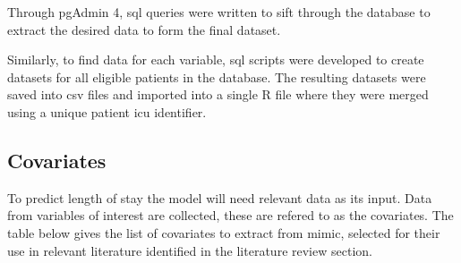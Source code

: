 \documentclass[11pt]{article}
\begin{document}
Through pgAdmin 4, \gls{sql} queries were written to sift through the database to extract the desired data to form the final dataset.

Similarly, to find data for each variable, \gls{sql} scripts were developed to create datasets for all eligible patients in the database. The resulting datasets were saved into \gls{csv} files and imported into a single R file where they were merged using a unique patient \gls{icu} identifier.

\subsection{Covariates}

To predict length of stay the model will need relevant data as its input. Data from variables of interest are collected, these are refered to as the covariates. The table below gives the list of covariates to extract from \gls{mimic}, selected for their use in relevant literature identified in the literature review section. 
\end{document}
